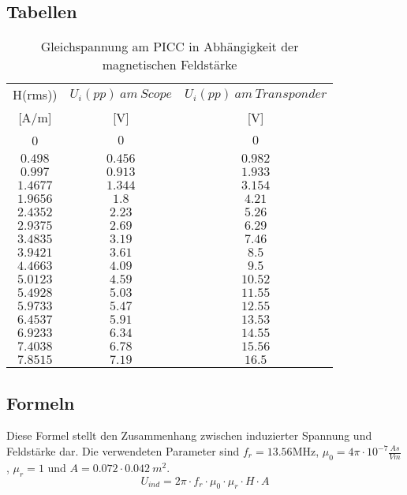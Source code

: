 \documentclass[12pt,a4paper,ngerman]{article}
\begin{document}
\subsection{Tabellen}
\begin{table}[H]
\begin{center}
\begin{tabular}{ |c|c|c| }
  \hline

    H(rms)) & $U_i(pp)\ am\ Scope$ & $U_i(pp)\ am\ Transponder$\\

	{[A/m]} & {[V]} & {[V]} \\
  \hline
  0 & $0$ & $0$\\
  \hline
  $0.498$ & $0.456$ & $0.982$ \\
  \hline
  $0.997$ & $0.913$ & $1.933$\\
  \hline
  $1.4677$ & $1.344$ & $3.154$\\
    \hline
  $1.9656$ & $1.8$ & $4.21$\\
    \hline
  $2.4352$ & $2.23$ & $5.26$ \\
    \hline
  $2.9375$ & $2.69$ & $6.29$\\
     \hline
  $3.4835$ & $3.19$ & $7.46$ \\ 
    \hline
  $3.9421$ & $3.61$ & $8.5$  \\
    \hline
  $4.4663$ & $4.09$ & $9.5$  \\
    \hline
  $5.0123$ & $4.59$ & $10.52$  \\
    \hline
  $5.4928$ & $5.03$ & $11.55$  \\
    \hline
  $5.9733$ & $5.47$ & $12.55$ \\
     \hline
  $6.4537$ & $5.91$ & $13.53$ \\
      \hline
  $6.9233$ & $6.34$ & $14.55$ \\ 
      \hline
  $7.4038$ & $6.78$ & $15.56$  \\
      \hline
  $7.8515$ & $7.19$ & $16.5$  \\
      \hline 
\end{tabular}
\caption{Gleichspannung am PICC in Abhängigkeit der magnetischen Feldstärke}
\label{tab:3}
\end{center}
\end{table} 

\subsection{Formeln}
Diese Formel stellt den Zusammenhang zwischen induzierter Spannung und Feldstärke dar. Die verwendeten Parameter sind $f_r = 13.56$MHz, $\mu_0 = 4\pi \cdot 10^{-7}\frac{As}{Vm}$, $\mu_r = 1$ und $A = 0.072 \cdot 0.042\ m^2$.
\begin{equation}
U_{ind} = 2\pi \cdot f_r \cdot \mu_0 \cdot \mu_r \cdot H \cdot A
\end{equation}
\end{document}
